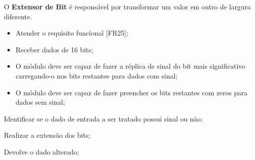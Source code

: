 O \textbf{Extensor de Bit} é responsável por transformar um valor em outro de largura diferente.
  
\actors
	\begin{description}
	\end{description}
  
\preconditions 
	\begin{itemize}
	\item Atender o requisito funcional [FR25];
	\item Receber dados de 16 bits;
	\end{itemize}

\postconditions
    \begin{itemize}
     \item O módulo deve ser capaz de fazer a réplica de sinal do bit mais significativo carregando-o nos bits restantes para dados com sinal;
     \item O módulo deve ser capaz de fazer preencher os bits restantes com zeros para dados sem sinal;
     \end{itemize}
  
\begin{mainflow}
\item Identificar se o dado de entrada a ser tratado possui sinal ou não;
\item Realizar a extensão dos bits;
\item Devolve o dado alterado;
\end{mainflow}
  
